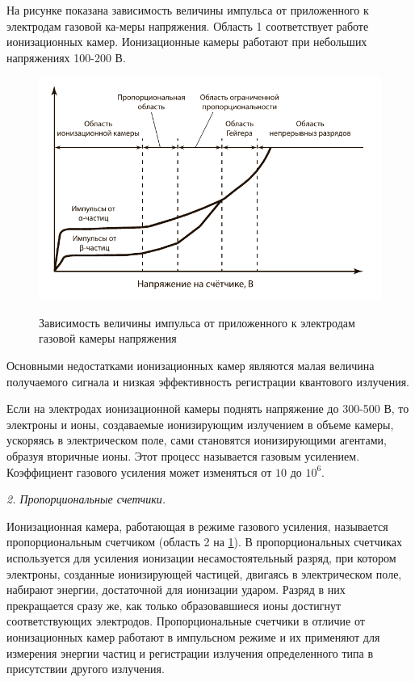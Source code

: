 \documentclass[14pt,pscyr,titlepage]{hedreport}
\begin{document}
		На рисунке показана зависимость величины импульса от приложенного к 
		электродам газовой ка-меры напряжения. Область 1 соответствует работе 
		ионизационных камер. Ионизационные камеры работают при небольших 
		напряжениях 100-200 В.

		\begin{figure}[h!]
			\center
			\includegraphics[width=.8\textwidth]{01} \\
			\caption{Зависимость величины импульса от приложенного к электродам 
				газовой камеры напряжения}
			\label{img:graph}
		\end{figure}

		Основными недостатками ионизационных камер являются малая величина 
		получаемого сигнала и низкая эффективность регистрации квантового 
		излучения.

		Если на электродах ионизационной камеры поднять напряжение до 
		300-500 В, то электроны и ионы, создаваемые ионизирующим излучением в 
		объеме камеры, ускоряясь в электрическом поле, сами становятся 
		ионизирующими агентами, образуя вторичные ионы. Этот процесс 
		называется газовым усилением. Коэффициент газового усиления может 
		изменяться от \( 10 \) до \( 10^6 \).

		\emph{2. Пропорциональные счетчики. }

		Ионизационная камера, работающая в режиме газового усиления, 
		называется пропорциональным счетчиком (область 2 на \ref{img:graph}). 
		В пропорциональных счетчиках используется для усиления ионизации 
		несамостоятельный разряд, при котором электроны, созданные 
		ионизирующей частицей, двигаясь в электрическом поле, набирают 
		энергии, достаточной для ионизации ударом. Разряд в них прекращается 
		сразу же, как только образовавшиеся ионы достигнут соответствующих 
		электродов. Пропорциональные счетчики в отличие от ионизационных 
		камер работают в импульсном режиме и их применяют для измерения 
		энергии частиц и регистрации излучения определенного типа в 
		присутствии другого излучения.
\end{document}
